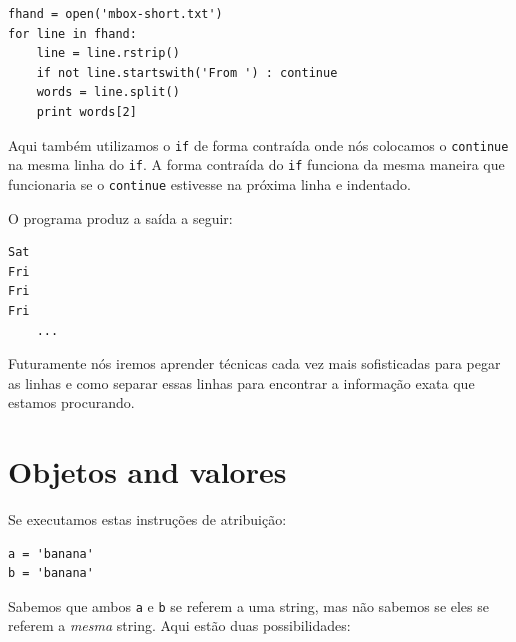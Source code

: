 \beforeverb
\begin{verbatim}
fhand = open('mbox-short.txt')
for line in fhand:
    line = line.rstrip()
    if not line.startswith('From ') : continue
    words = line.split()
    print words[2]
\end{verbatim}
\afterverb
%
Aqui também utilizamos o {\tt if} de forma contraída
onde nós colocamos o {\tt continue } na mesma linha
do {\tt if}. A forma contraída do {\tt if} funciona
da mesma maneira que funcionaria se o {\tt continue}
estivesse na próxima linha e indentado.

O programa produz a saída a seguir:



\beforeverb
\begin{verbatim}
Sat
Fri
Fri
Fri
    ...
\end{verbatim}
\afterverb
%
Futuramente nós iremos aprender técnicas cada vez mais sofisticadas
para pegar as linhas e como separar essas linhas para encontrar a 
informação exata que estamos procurando.


\section{Objetos and valores}


Se executamos estas instruções de atribuição:

\beforeverb
\begin{verbatim}
a = 'banana'
b = 'banana'
\end{verbatim}
\afterverb
%
Sabemos que ambos {\tt a} e {\tt b} se referem a 
uma string, mas não sabemos se eles se referem a \emph{mesma} string.
Aqui estão duas possibilidades:


